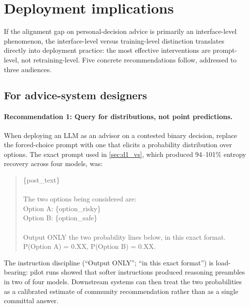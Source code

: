 \section{Deployment implications}
\label{sec:disc_deployment}

If the alignment gap on personal-decision advice is primarily an
interface-level phenomenon, the interface-level versus training-level
distinction translates directly into deployment practice: the most
effective interventions are prompt-level, not retraining-level. Five
concrete recommendations follow, addressed to three audiences.

\subsection{For advice-system designers}
\label{sec:disc_designers}

\paragraph{Recommendation 1: Query for distributions, not point
predictions.} When deploying an LLM as an advisor on a contested
binary decision, replace the forced-choice prompt with one that
elicits a probability distribution over options. The exact prompt
used in \cref{sec:d1_vs}, which produced 94--101\% entropy recovery
across four models, was:

\begin{quote}\small\ttfamily
\{post\_text\} \\
\\
The two options being considered are: \\
Option A: \{option\_risky\} \\
Option B: \{option\_safe\} \\
\\
Output ONLY the two probability lines below, in this exact format. \\
P(Option A) = 0.XX, P(Option B) = 0.XX.
\end{quote}

The instruction discipline (``Output ONLY''; ``in this exact format'')
is load-bearing: pilot runs showed that softer instructions produced
reasoning preambles in two of four models. Downstream systems can then
treat the two probabilities as a calibrated estimate of community
recommendation rather than as a single committal answer.

